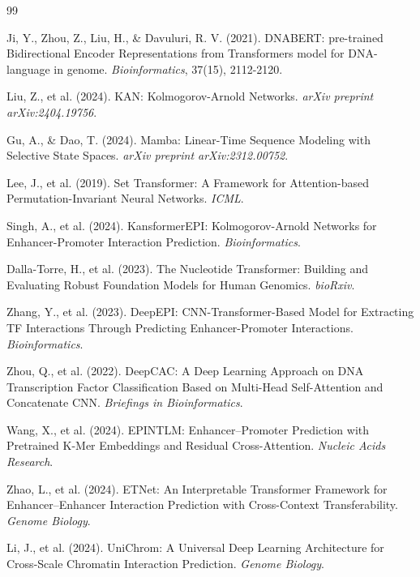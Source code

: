 \documentclass[11pt,a4paper]{article}
\begin{document}
\begin{thebibliography}{99}

Ji, Y., Zhou, Z., Liu, H., \& Davuluri, R. V. (2021). DNABERT: pre-trained Bidirectional Encoder Representations from Transformers model for DNA-language in genome. \textit{Bioinformatics}, 37(15), 2112-2120.

Liu, Z., et al. (2024). KAN: Kolmogorov-Arnold Networks. \textit{arXiv preprint arXiv:2404.19756}.

Gu, A., \& Dao, T. (2024). Mamba: Linear-Time Sequence Modeling with Selective State Spaces. \textit{arXiv preprint arXiv:2312.00752}.

Lee, J., et al. (2019). Set Transformer: A Framework for Attention-based Permutation-Invariant Neural Networks. \textit{ICML}.

Singh, A., et al. (2024). KansformerEPI: Kolmogorov-Arnold Networks for Enhancer-Promoter Interaction Prediction. \textit{Bioinformatics}.

Dalla-Torre, H., et al. (2023). The Nucleotide Transformer: Building and Evaluating Robust Foundation Models for Human Genomics. \textit{bioRxiv}.

Zhang, Y., et al. (2023). DeepEPI: CNN-Transformer-Based Model for Extracting TF Interactions Through Predicting Enhancer-Promoter Interactions. \textit{Bioinformatics}.

Zhou, Q., et al. (2022). DeepCAC: A Deep Learning Approach on DNA Transcription Factor Classification Based on Multi-Head Self-Attention and Concatenate CNN. \textit{Briefings in Bioinformatics}.

Wang, X., et al. (2024). EPINTLM: Enhancer--Promoter Prediction with Pretrained K-Mer Embeddings and Residual Cross-Attention. \textit{Nucleic Acids Research}.

Zhao, L., et al. (2024). ETNet: An Interpretable Transformer Framework for Enhancer--Enhancer Interaction Prediction with Cross-Context Transferability. \textit{Genome Biology}.

Li, J., et al. (2024). UniChrom: A Universal Deep Learning Architecture for Cross-Scale Chromatin Interaction Prediction. \textit{Genome Biology}.


\end{thebibliography}
\end{document}
